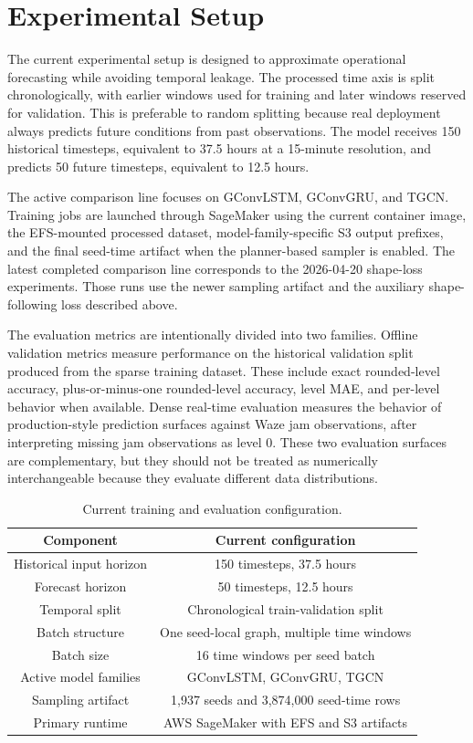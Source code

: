 \documentclass[11pt, a4paper]{article}
\begin{document}
\section{Experimental Setup}

The current experimental setup is designed to approximate operational forecasting while avoiding temporal leakage. The processed time axis is split chronologically, with earlier windows used for training and later windows reserved for validation. This is preferable to random splitting because real deployment always predicts future conditions from past observations. The model receives 150 historical timesteps, equivalent to 37.5 hours at a 15-minute resolution, and predicts 50 future timesteps, equivalent to 12.5 hours.

The active comparison line focuses on GConvLSTM, GConvGRU, and TGCN. Training jobs are launched through SageMaker using the current container image, the EFS-mounted processed dataset, model-family-specific S3 output prefixes, and the final seed-time artifact when the planner-based sampler is enabled. The latest completed comparison line corresponds to the 2026-04-20 shape-loss experiments. Those runs use the newer sampling artifact and the auxiliary shape-following loss described above.

The evaluation metrics are intentionally divided into two families. Offline validation metrics measure performance on the historical validation split produced from the sparse training dataset. These include exact rounded-level accuracy, plus-or-minus-one rounded-level accuracy, level MAE, and per-level behavior when available. Dense real-time evaluation measures the behavior of production-style prediction surfaces against Waze jam observations, after interpreting missing jam observations as level 0. These two evaluation surfaces are complementary, but they should not be treated as numerically interchangeable because they evaluate different data distributions.

\begin{table}[htbp]
\centering
\caption{Current training and evaluation configuration.}
\begin{tabular}{|c|c|}
\hline
\textbf{Component} & \textbf{Current configuration} \\
\hline
Historical input horizon & 150 timesteps, 37.5 hours \\
\hline
Forecast horizon & 50 timesteps, 12.5 hours \\
\hline
Temporal split & Chronological train-validation split \\
\hline
Batch structure & One seed-local graph, multiple time windows \\
\hline
Batch size & 16 time windows per seed batch \\
\hline
Active model families & GConvLSTM, GConvGRU, TGCN \\
\hline
Sampling artifact & 1,937 seeds and 3,874,000 seed-time rows \\
\hline
Primary runtime & AWS SageMaker with EFS and S3 artifacts \\
\hline
\end{tabular}
\end{table}
\end{document}
